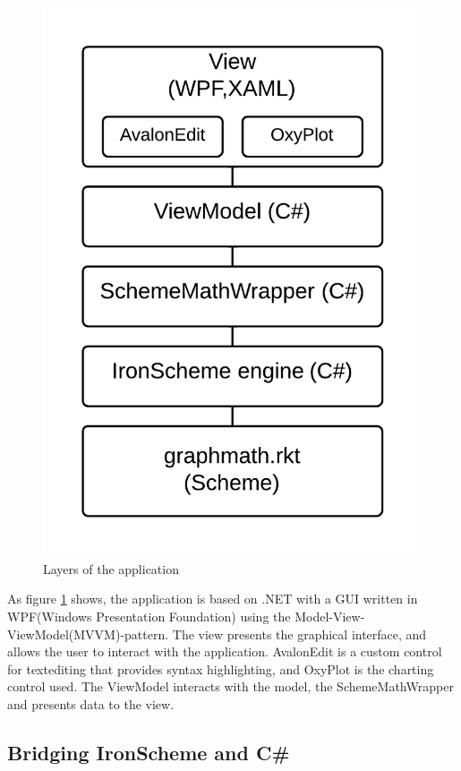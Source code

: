 \documentclass[a4paper,12pt]{article}
\begin{document}
\begin{figure}[h]
	\centering
	\includegraphics[scale=0.23]{MultiParadigmeBlocks}
	\caption{Layers of the application}
    \label{fig:layers}
\end{figure}

As figure \ref{fig:layers} shows, the application is based on .NET with a GUI written in WPF(Windows Presentation Foundation) using the Model-View-ViewModel(MVVM)-pattern. The view presents the graphical interface, and allows the user to interact with the application. AvalonEdit is a custom control for textediting that provides syntax highlighting, and OxyPlot is the charting control used. The ViewModel interacts with the model, the SchemeMathWrapper and presents data to the view.

\subsection{Bridging IronScheme and C\#}
 
\end{document}
